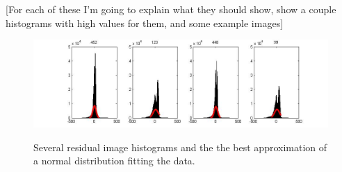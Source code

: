 [For each of these I'm going to explain what they should show, show a couple histograms with high values for them, and some example images]

\begin{figure}
	\centering
		\includegraphics[width=1\textwidth]{figures/severalHists.jpg}
	\label{fig:severalHists}
	
		\caption[Several residual image histograms.]{Several residual image histograms and the the best approximation of a normal distribution fitting the data.}
\end{figure}

